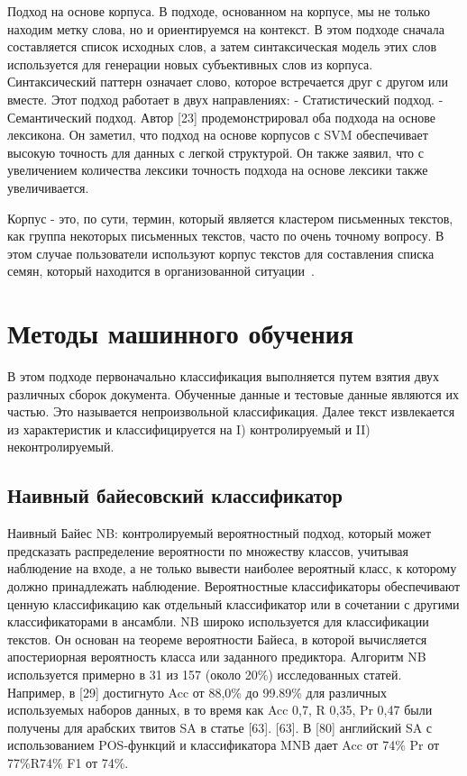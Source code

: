 Подход на основе корпуса. В подходе, основанном на корпусе, мы не только находим
метку слова, но и ориентируемся на контекст. В этом подходе сначала составляется
список исходных слов, а затем синтаксическая модель этих слов используется для
генерации новых субъективных слов из корпуса. Синтаксический паттерн означает
слово, которое встречается друг с другом или вместе. Этот подход работает в двух
направлениях:
- Статистический подход.
- Семантический подход.
Автор [23] продемонстрировал оба подхода на основе лексикона. Он заметил, что
подход на основе корпусов с SVM обеспечивает высокую точность для данных с
легкой структурой. Он также заявил, что с увеличением количества лексики
точность подхода на основе лексики также увеличивается.\cite{article16}

Корпус - это, по сути, термин, который является кластером письменных текстов,
как группа некоторых письменных текстов, часто по очень точному вопросу. В этом
случае пользователи используют корпус текстов для составления списка семян,
который находится в организованной ситуации~\cite{article18}.


\section{Методы машинного обучения}

В этом подходе первоначально классификация выполняется путем взятия двух
различных сборок документа. Обученные данные и тестовые данные являются их
частью. Это называется непроизвольной классификация. Далее текст извлекается из
характеристик и классифицируется на I) контролируемый и II) неконтролируемый.
\cite{article18}

\subsection{Наивный байесовский классификатор}

Наивный Байес NB: контролируемый вероятностный подход, который может предсказать
распределение вероятности по множеству классов, учитывая наблюдение на входе, а
не только вывести наиболее вероятный класс, к которому должно принадлежать
наблюдение. Вероятностные классификаторы обеспечивают ценную классификацию как
отдельный классификатор или в сочетании с другими классификаторами в ансамбли.
NB широко используется для классификации текстов. Он основан на теореме
вероятности Байеса, в которой вычисляется апостериорная вероятность класса или
заданного предиктора.  Алгоритм NB используется примерно в 31 из 157 (около
20\%) исследованных статей. Например, в [29] достигнуто Acc от 88,0\% до 99.89\%
для различных используемых наборов данных, в то время как Acc 0,7, R 0,35, Pr
0,47 были получены для арабских твитов SA в статье [63]. [63]. В [80] английский
SA с использованием POS-функций и классификатора MNB дает Acc от 74\% Pr от
77\%R74\% F1 от 74\%.~\cite{article2}

